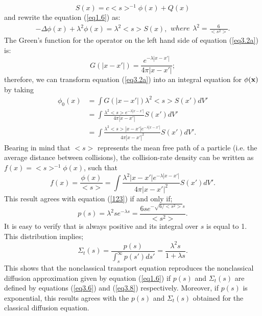 \documentclass[a4paper, 12pt]{report}
\newcommand{\bl}{\big<}
\newcommand{\bg}{\big>}
\begin{document}
\begin{equation}
S(x) = c\bl s\bg^{-1}\phi(x)+Q(x)
\end{equation} 
and rewrite the equation (\ref{eq1.6}) as:
\begin{subequations}\label{eq3.2}
\begin{align}
-\Delta\phi(x) + \lambda^2 \phi(x) = \lambda^2 \bl s \bg S(x),\label{eq3.2a}
\end{align}
where
\begin{align}
\lambda^2=\frac{6}{\bl s^2 \bg}.
\end{align}
\end{subequations}
The Green's function for the operator on the left hand side of equation (\ref{eq3.2a}) is:
\begin{equation}
\label{eq3.3}
G(|x-x'|) = \frac{e^{-\lambda |x-x'|}}{4\pi |x-x'|};
\end{equation}
therefore, we can transform equation (\eqref{eq3.2a}) into an integral equation for $\phi(\bf x)$ by taking
\begin{align}\label{eq3.4}
\phi_0(x) &= \int G(|x-x'|) \lambda^2\bl s \bg S(x') dV' \\
&= \int \frac{\lambda^2\bl s \bg e^{-\lambda |x-x'|}}{4\pi  |x-x'|} S(x') dV'  \nonumber \\
&= \int \frac{\lambda^2 \bl s \bg |x-x'| e^{-\lambda |x-x'|}}{4\pi |x-x'|^2} S(x') dV'.\nonumber
\end{align}
Bearing in mind that $\bl s\bg$ represents the mean free path of a particle (i.e. the average distance between collisions), the collision-rate density can be written as $f(x)=\bl s\bg^{-1} \phi(x)$, such that
\begin{equation}
\label{eq3.5}
f(x)=\frac{\phi(x)}{\bl s \bg} = \int \frac{\lambda^2 |x-x'| e^{-\lambda |x-x'|}}{4\pi |x-x'|^2} S(x') dV'.
\end{equation}
This result agrees with equation (\ref{123}) if and only if;
\begin{equation}
\label{eq3.6}
p(s) = \lambda^2se^{-\lambda s}=\frac{6se^{-\sqrt{6/<s^2>}s}}{\bl s^2\bg}.
\end{equation}
It is easy to verify that is always positive and its integral over $s$ is equal to 1.
This distribution implies;
\begin{equation}
\label{eq3.8}
\Sigma_t(s) = \frac{p(s)}{\int_s^\infty p(s')ds'} = \frac{\lambda^2 s}{1+\lambda s}.
\end{equation}
This shows that the nonclassical transport equation reproduces the nonclassical diffusion approximation given by equation  (\ref{eq1.6}) if $p(s)$ and $\Sigma_t(s)$ are defined by equations (\ref{eq3.6}) and (\ref{eq3.8}) respectively. Moreover, if $p(s)$ is exponential, this results agrees with the $p(s)$ and $\Sigma_t(s)$ obtained for the classical diffusion equation.  
\end{document}

